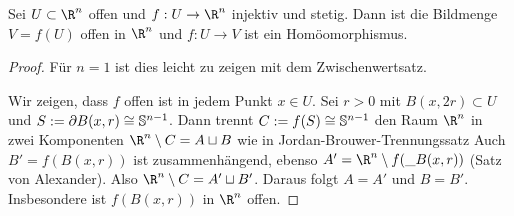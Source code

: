 \begin{st}
	Sei $U \subset \R^n$ offen und $f: U \to \R^n$ injektiv und stetig.
	Dann ist die Bildmenge $V = f(U)$ offen in $\R^n$ und $f: U \to V$ ist ein Homöomorphismus.
	\begin{proof}
		Für $n = 1$ ist dies leicht zu zeigen mit dem Zwischenwertsatz.

		Wir zeigen, dass $f$ offen ist in jedem Punkt $x \in U$.
		Sei $r > 0$ mit $B(x, 2r) \subset U$ und $S := \partial B(x,r) \cong \mathbb{S}^{n-1}$.
		Dann trennt $C := f(S) \cong \mathbb{S}^{n-1}$ den Raum $\R^n$ in zwei Komponenten $\R^n \setminus C = A \dunion B$ wie in Jordan-Brouwer-Trennungssatz %
		Auch $B' = f(B(x,r))$ ist zusammenhängend, ebenso $A' = \R^n \setminus f(\_B(x,r))$ (Satz von Alexander).
		Also $\R^n \setminus C = A' \dunion B'$.
		Daraus folgt $A = A'$ und $B = B'$.
		Insbesondere ist $f(B(x,r))$ in $\R^n$ offen.
	\end{proof}
\end{st}
